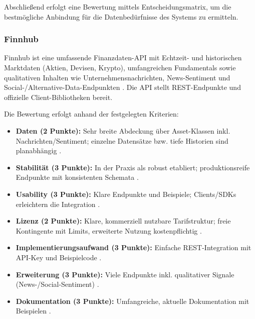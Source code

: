     Abschließend erfolgt eine Bewertung mittels Entscheidungsmatrix, um die bestmögliche Anbindung für die Datenbedürfnisse des Systems zu ermitteln.

    \subsubsection{Finnhub}

      Finnhub ist eine umfassende Finanzdaten-\acs{API} mit Echtzeit- und historischen Marktdaten (Aktien, Devisen, Krypto), umfangreichen Fundamentals sowie qualitativen Inhalten wie Unterneh­mensnachrichten, News-Sentiment und Social-/Alternative-Data-Endpunkten \autocite{FinnhubDocs2025}.
      Die \acs{API} stellt \acs{REST}-Endpunkte und offizielle Client-Bibliotheken bereit.

      Die Bewertung erfolgt anhand der festgelegten Kriterien:
      \begin{itemize}
        \item \textbf{Daten (2 Punkte):} Sehr breite Abdeckung über Asset-Klassen inkl. Nachrichten/Sentiment; einzelne Datensätze bzw. tiefe Historien sind planabhängig \autocite{FinnhubDocs2025}.
        \item \textbf{Stabilität (3 Punkte):} In der Praxis als robust etabliert; produktionsreife Endpunkte mit konsistenten Schemata \autocite{FinnhubDocs2025}.
        \item \textbf{Usability (3 Punkte):} Klare Endpunkte und Beispiele; Clients/SDKs erleichtern die Integration \autocite{FinnhubDocs2025}.
        \item \textbf{Lizenz (2 Punkte):} Klare, kommerziell nutzbare Tarifstruktur; freie Kontingente mit Limits, erweiterte Nutzung kostenpflichtig \autocite{FinnhubDocs2025}.
        \item \textbf{Implementierungsaufwand (3 Punkte):} Einfache \acs{REST}-Integration mit \acs{API}-Key und Beispielcode \autocite{FinnhubDocs2025}.
        \item \textbf{Erweiterung (3 Punkte):} Viele Endpunkte inkl. qualitativer Signale (News-/Social-Sentiment) \autocite{FinnhubDocs2025}.
        \item \textbf{Dokumentation (3 Punkte):} Umfangreiche, aktuelle Dokumentation mit Beispielen \autocite{FinnhubDocs2025}.
      \end{itemize}

      \global\def\VfinnhubDaten{2}
      \global\def\VfinnhubStabilität{3}
      \global\def\VfinnhubUsability{3}
      \global\def\VfinnhubLizenz{2}
      \global\def\VfinnhubImplement{3}
      \global\def\VfinnhubErweiterung{3}
      \global\def\VfinnhubDokumentation{3}

